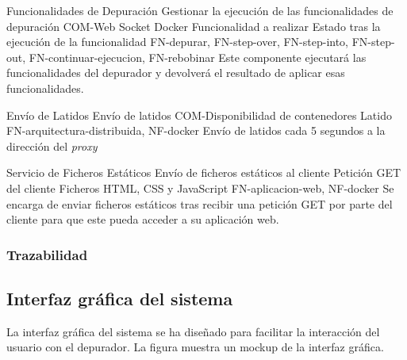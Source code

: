 \begin{component}{Funcionalidades de Depuración}
{Gestionar la ejecución de las funcionalidades de depuración}
{COM-Web Socket Docker} %
{Funcionalidad a realizar} %
{Estado tras la ejecución de la funcionalidad} %
{FN-depurar, FN-step-over, FN-step-into, FN-step-out, FN-continuar-ejecucion, FN-rebobinar} %
Este componente ejecutará las funcionalidades del depurador y devolverá el resultado de aplicar esas funcionalidades. %
\end{component}

\begin{component}{Envío de Latidos}
{Envío de latidos}
{COM-Disponibilidad de contenedores} %
{\NA} %
{Latido} %
{FN-arquitectura-distribuida, NF-docker} %
Envío de latidos cada 5 segundos a la dirección del \textit{\gls{proxy}}
\end{component}

\begin{component}{Servicio de Ficheros Estáticos}
{Envío de ficheros estáticos al cliente}
{\NA}
{Petición GET del cliente} %
{Ficheros HTML, CSS y JavaScript}
{FN-aplicacion-web, NF-docker} %
Se encarga de enviar ficheros estáticos tras recibir una petición GET por parte del cliente para que este pueda acceder a su aplicación web.
\end{component}

\FloatBarrier


\begin{landscape}
    \subsubsection{Trazabilidad} {\label{subsubsec:trazabilidad-comp}}
    \begin{table}[htb]
        {\traceabilityCompFN}
    \end{table}
\end{landscape}


\subsection{Interfaz gráfica del sistema} \label{sec:interfaz-grafica}
La interfaz gráfica del sistema se ha diseñado para facilitar la interacción del usuario con el depurador. La figura  muestra un mockup de la interfaz gráfica.

